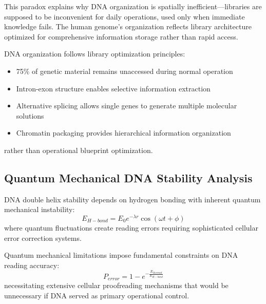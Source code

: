 ﻿\documentclass[11pt,a4paper]{article}
\begin{document}
This paradox explains why DNA organization is spatially inefficient—libraries are supposed to be inconvenient for daily operations, used only when immediate knowledge fails. The human genome's organization reflects library architecture optimized for comprehensive information storage rather than rapid access.

\begin{theorem}
DNA organization follows library optimization principles:
\begin{itemize}
\item 75\% of genetic material remains unaccessed during normal operation
\item Intron-exon structure enables selective information extraction
\item Alternative splicing allows single genes to generate multiple molecular solutions
\item Chromatin packaging provides hierarchical information organization
\end{itemize}
rather than operational blueprint optimization.
\end{theorem}

\subsection{Quantum Mechanical DNA Stability Analysis}

\begin{definition}
DNA double helix stability depends on hydrogen bonding with inherent quantum mechanical instability:
\begin{equation}
E_{H-bond} = E_0 e^{-\lambda r} \cos(\omega t + \phi)
\end{equation}
where quantum fluctuations create reading errors requiring sophisticated cellular error correction systems.
\end{definition}

\begin{theorem}
Quantum mechanical limitations impose fundamental constraints on DNA reading accuracy:
\begin{equation}
P_{error} = 1 - e^{-\frac{E_{thermal}}{E_{H-bond}}}
\end{equation}
necessitating extensive cellular proofreading mechanisms that would be unnecessary if DNA served as primary operational control.
\end{theorem}
\end{document}
